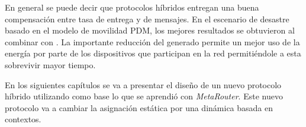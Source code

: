 En general se puede decir que protocolos híbridos entregan una buena compensación
entre tasa de entrega y \overhead{} de mensajes. En el escenario de desastre
basado en el modelo de movilidad PDM, los mejores resultados se obtuvieron al
combinar \prophet{} con \syf. La importante reducción del \overhead{} generado
permite un mejor uso de la energía por parte de los dispositivos que participan
en la red permitiéndole a esta sobrevivir mayor tiempo.

En los siguientes capítulos se va a presentar el diseño de un nuevo protocolo
híbrido utilizando como base lo que se aprendió con \textit{MetaRouter}. Este
nuevo protocolo va a cambiar la asignación estática por una dinámica basada en
contextos.
